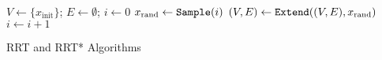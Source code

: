 \begin{algorithm}[H]
  $V \leftarrow \{ x_\mathrm{init}\}$; $E \leftarrow \emptyset$; $i\leftarrow 0$\; \label{line:initial}
   { \label{line:iteration_start}
    $x_\mathrm{rand} \leftarrow {\tt Sample}(i)$\;  \label{line:sample} 
    $(V, E)\leftarrow {\tt Extend}((V,E),x_\mathrm{rand})$\;  \label{line:extend}
    $i \leftarrow i + 1$\; \label{line:iteration_end}
  }
  \caption{RRT and RRT* Algorithms}
  \label{algorithm:RRT_body}
\end{algorithm}